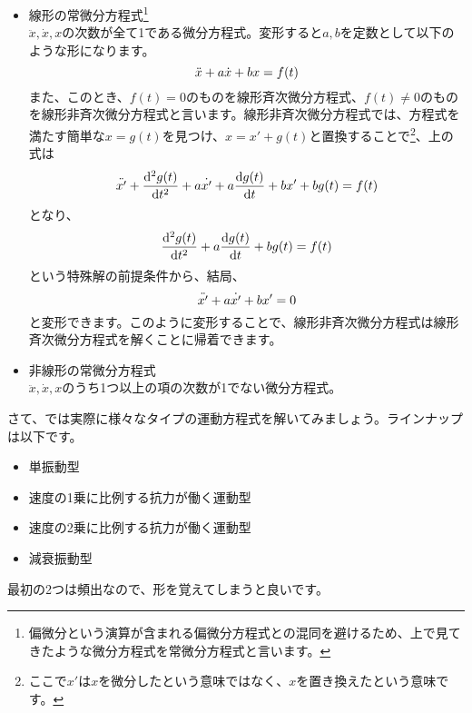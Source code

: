 \begin{itemize}
    \item 線形の常微分方程式\footnote{偏微分という演算が含まれる偏微分方程式との混同を避けるため、上で見てきたような微分方程式を常微分方程式と言います。}　\\
            $\ddot{x},\dot{x},x$の次数が全て1である微分方程式。変形すると$a,b$を定数として以下のような形になります。\\
            \begin{equation}
                \ddot{x} + a\dot{x} + bx = f(t) \notag
            \end{equation}
            また、このとき、$f(t)=0$のものを線形斉次微分方程式、$f(t)\neq 0$のものを線形非斉次微分方程式と言います。線形非斉次微分方程式では、方程式を満たす簡単な$x = g(t)$を見つけ、$x = x' + g(t)$と置換することで\footnote{ここで$x'$は$x$を微分したという意味ではなく、$x$を置き換えたという意味です。}、上の式は
            \begin{equation}
                \ddot{x'} + \frac{\mathrm{d^2}g(t)}{\mathrm{d}t^2} + a\dot{x'} + a\frac{\mathrm{d}g(t)}{\mathrm{d}t} + bx' + bg(t) = f(t) \notag
            \end{equation}
            となり、
            \begin{equation}
                \frac{\mathrm{d^2}g(t)}{\mathrm{d}t^2} + a\frac{\mathrm{d}g(t)}{\mathrm{d}t} + bg(t) = f(t) \notag
            \end{equation}
            という特殊解の前提条件から、結局、
            \begin{equation}
                \ddot{x'} + a\dot{x'} + bx' = 0 \notag
            \end{equation}
            と変形できます。このように変形することで、線形非斉次微分方程式は線形斉次微分方程式を解くことに帰着できます。
    \item 非線形の常微分方程式\\
            $\ddot{x},\dot{x},x$のうち1つ以上の項の次数が1でない微分方程式。
\end{itemize}

\par

さて、では実際に様々なタイプの運動方程式を解いてみましょう。ラインナップは以下です。
\begin{itemize}
    \item 単振動型
    \item 速度の1乗に比例する抗力が働く運動型
    \item 速度の2乗に比例する抗力が働く運動型
    \item 減衰振動型
\end{itemize}
最初の2つは頻出なので、形を覚えてしまうと良いです。

